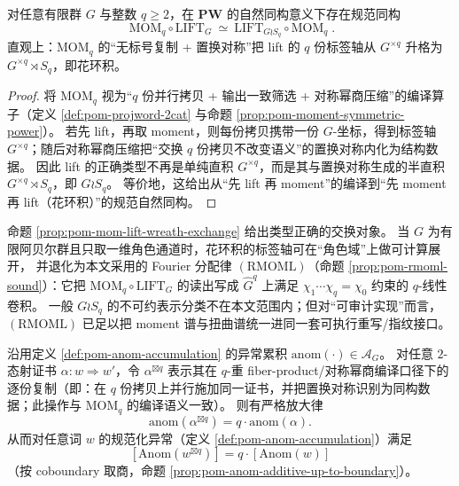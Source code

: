 \begin{proposition}\label{prop:pom-mom-lift-wreath-exchange}\label{prop:pom-mom-lift-wreath}
对任意有限群 \(G\) 与整数 \(q\ge 2\)，在 \(\mathbf{PW}\) 的自然同构意义下存在规范同构
\[
\boxed{\;
\mathrm{MOM}_q\circ \mathrm{LIFT}_G
\ \simeq\
\mathrm{LIFT}_{G\wr S_q}\circ \mathrm{MOM}_q\; }.
\]
直观上：\(\mathrm{MOM}_q\) 的“无标号复制 + 置换对称”把 lift 的 \(q\) 份标签轴从 \(G^{\times q}\) 升格为 \(G^{\times q}\rtimes S_q\)，即花环积。
\end{proposition}

\begin{proof}
将 \(\mathrm{MOM}_q\) 视为“\(q\) 份并行拷贝 + 输出一致筛选 + 对称幂商压缩”的编译算子（定义 \ref{def:pom-projword-2cat} 与命题 \ref{prop:pom-moment-symmetric-power}）。
若先 lift，再取 moment，则每份拷贝携带一份 \(G\)-坐标，得到标签轴 \(G^{\times q}\)；随后对称幂商压缩把“交换 \(q\) 份拷贝不改变语义”的置换对称内化为结构数据。
因此 lift 的正确类型不再是单纯直积 \(G^{\times q}\)，而是其与置换对称生成的半直积 \(G^{\times q}\rtimes S_q\)，即 \(G\wr S_q\)。
等价地，这给出从“先 lift 再 moment”的编译到“先 moment 再 lift（花环积）”的规范自然同构。
\end{proof}

\begin{remark}\label{rem:pom-wreath-shadow-rmoml}
命题 \ref{prop:pom-mom-lift-wreath-exchange} 给出类型正确的交换对象。
当 \(G\) 为有限阿贝尔群且只取一维角色通道时，花环积的标签轴可在“角色域”上做可计算展开，
并退化为本文采用的 Fourier 分配律 \((\mathrm{RMOML})\)（命题 \ref{prop:pom-rmoml-sound}）：它把 \(\mathrm{MOM}_q\circ \mathrm{LIFT}_G\) 的读出写成 \(\widehat G^q\) 上满足 \(\chi_1\cdots\chi_q=\chi_0\) 约束的 \(q\)-线性卷积。
一般 \(G\wr S_q\) 的不可约表示分类不在本文范围内；但对“可审计实现”而言，\((\mathrm{RMOML})\) 已足以把 moment 谱与扭曲谱统一进同一套可执行重写/指纹接口。
\end{remark}

\begin{proposition}\label{prop:pom-anom-gap-amplification}
\leanverified{paper\_pom\_anom\_gap\_amplification}
沿用定义 \ref{def:pom-anom-accumulation} 的异常累积 \(\mathrm{anom}(\cdot)\in\mathcal{A}_G\)。
对任意 \(2\)-态射证书 \(\alpha:w\Rightarrow w'\)，令 \(\alpha^{\boxtimes q}\) 表示其在 \(q\)-重 fiber-product/对称幂商编译口径下的逐份复制（即：在 \(q\) 份拷贝上并行施加同一证书，并把置换对称识别为同构数据；此操作与 \(\mathrm{MOM}_q\) 的编译语义一致）。
则有严格放大律
\[
\boxed{\;\mathrm{anom}(\alpha^{\boxtimes q})=q\cdot \mathrm{anom}(\alpha).\;}
\]
从而对任意词 \(w\) 的规范化异常（定义 \ref{def:pom-anom-accumulation}）满足
\[
\boxed{\;[\mathrm{Anom}(w^{\boxtimes q})]=q\cdot [\mathrm{Anom}(w)]\;}
\]
（按 coboundary 取商，命题 \ref{prop:pom-anom-additive-up-to-boundary}）。
\end{proposition}

